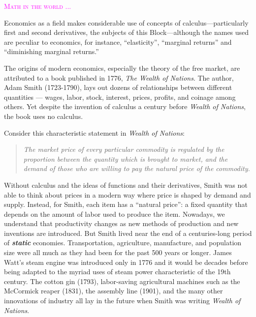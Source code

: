 \documentclass[
  letterpaper,
  DIV=11,
  numbers=noendperiod,
  oneside]{scrreprt}
\newenvironment{intheworld}%
{%
\textcolor{magenta}{\hrulefill}%
  \par\vspace{.3\baselineskip}%
  \textcolor{magenta}{\scshape Math in the world ...}%
  \par\vspace{\baselineskip}%
}%
{\textcolor{magenta}{\hrulefill}}
\begin{document}
\begin{intheworld}
Economics as a field makes considerable use of concepts of
calculus---particularly first and second derivatives, the subjects of
this Block---although the names used are peculiar to economics, for
instance, ``elasticity'', ``marginal returns'' and ``diminishing
marginal returns.''

The origins of modern economics, especially the theory of the free
market, are attributed to a book published in 1776, \emph{The Wealth of
Nations}. The author, Adam Smith (1723-1790), lays out dozens of
relationships between different quantities --- wages, labor, stock,
interest, prices, profits, and coinage among others. Yet despite the
invention of calculus a century before \emph{Wealth of Nations}, the
book uses no calculus.

Consider this characteristic statement in \emph{Wealth of Nations}:

\begin{quote}
\emph{The market price of every particular commodity is regulated by the
proportion between the quantity which is brought to market, and the
demand of those who are willing to pay the natural price of the
commodity.}
\end{quote}

Without calculus and the ideas of functions and their derivatives, Smith
was not able to think about prices in a modern way where price is shaped
by demand and supply. Instead, for Smith, each item has a ``natural
price'': a fixed quantity that depends on the amount of labor used to
produce the item. Nowadays, we understand that productivity changes as
new methods of production and new inventions are introduced. But Smith
lived near the end of a centuries-long period of \textbf{\emph{static}}
economies. Transportation, agriculture, manufacture, and population size
were all much as they had been for the past 500 years or longer. James
Watt's steam engine was introduced only in 1776 and it would be decades
before being adapted to the myriad uses of steam power characteristic of
the 19th century. The cotton gin (1793), labor-saving agricultural
machines such as the McCormick reaper (1831), the assembly line (1901),
and the many other innovations of industry all lay in the future when
Smith was writing \emph{Wealth of Nations}.

\begin{marginfigure}


\end{marginfigure}
\end{intheworld}
\end{document}
